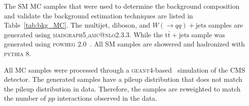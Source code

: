 The SM MC samples that were used to determine the background composition and validate the background estimation techniques are listed in Table~\ref{tab:bkg_MC}. The multijet, diboson, and $W(\rightarrow qq) + \mathrm{jets}$ samples are generated using \textsc{madgraph5}$\_$a\textsc{mc}\textsc{@nlo}2.3.3. While the $\mathrm{t\bar{t}} + \mathrm{jets}$ sample was generated using \textsc{powheg} 2.0~\cite{POWHEG, POWHEG2, POWHEG3}. All SM samples are showered and hadronized with \textsc{pythia} 8. 

All MC samples were processed through a \textsc{geant4}-based~\cite{GEANT4, GEANT42} simulation of the CMS detector. The generated samples have a pileup distribution that does not match the pileup distribution in data. Therefore, the samples are reweighted to match the number of $pp$ interactions observed in the data.


